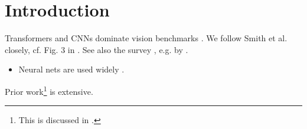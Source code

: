 \section{Introduction}
Transformers \cite{vaswani2017} and CNNs \cite{lecun1998} dominate vision benchmarks \cite{dosovitskiy2021}.
We follow Smith et al. \cite{smith2020} closely, cf. Fig. 3 in \citet{lecun1998}.
See also the survey \citep[see][Thm.~2, p.~14]{smith2020}, e.g. by \citet{doe2024}.

\begin{itemize}
\item Neural nets are used widely \cite{lecun1998}.
\end{itemize}
Prior work\footnote{This is discussed in \cite{footnoted2021}.} is extensive.

